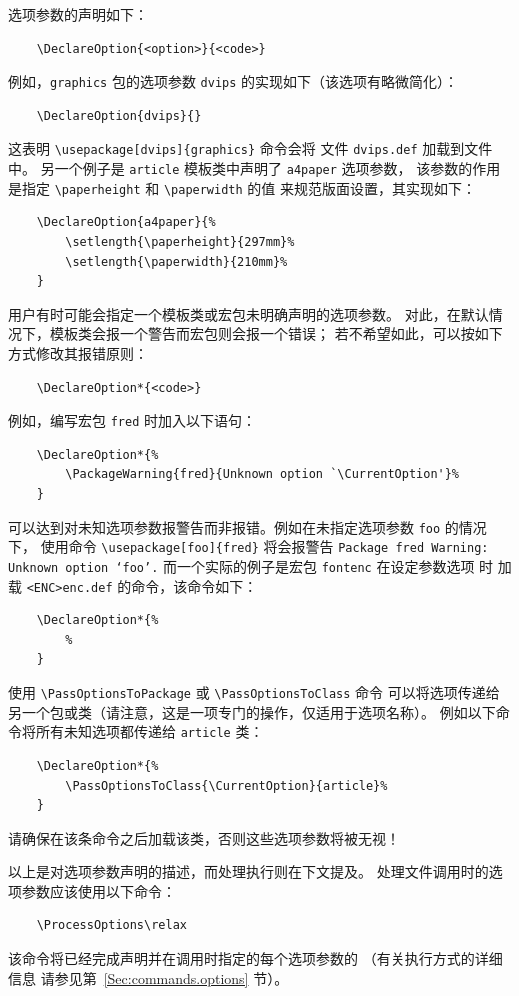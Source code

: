 \documentclass{ltxguide}[1995/11/28]
\begin{document}
选项参数的声明如下：
\begin{verbatim}
	\DeclareOption{<option>}{<code>}
\end{verbatim}
例如，\verb|graphics| 包的选项参数 \verb|dvips| 的实现如下（该选项有略微简化）：
\begin{verbatim}
	\DeclareOption{dvips}{}
\end{verbatim}
这表明 \verb|\usepackage[dvips]{graphics}| 命令会将
文件 \verb|dvips.def| 加载到文件中。
另一个例子是 \verb|article| 模板类中声明了 \verb|a4paper| 选项参数，
该参数的作用是指定 \verb|\paperheight| 和 \verb|\paperwidth| 的值
来规范版面设置，其实现如下：
\begin{verbatim}
	\DeclareOption{a4paper}{%
		\setlength{\paperheight}{297mm}%
		\setlength{\paperwidth}{210mm}%
	}
\end{verbatim}
用户有时可能会指定一个模板类或宏包未明确声明的选项参数。
对此，在默认情况下，模板类会报一个警告而宏包则会报一个错误；
若不希望如此，可以按如下方式修改其报错原则：
\begin{verbatim}
	\DeclareOption*{<code>}
\end{verbatim}
例如，编写宏包 \verb|fred| 时加入以下语句：
\begin{verbatim}
	\DeclareOption*{%
		\PackageWarning{fred}{Unknown option `\CurrentOption'}%
	}
\end{verbatim}
可以达到对未知选项参数报警告而非报错。例如在未指定选项参数 \verb|foo| 的情况下，
使用命令 \verb|\usepackage[foo]{fred}| 将会报警告 \texttt{Package fred Warning: Unknown option `foo'.}
而一个实际的例子是宏包 \verb|fontenc| 在设定参数选项  时
加载 \verb|<ENC>enc.def| 的命令，该命令如下：
\begin{verbatim}
	\DeclareOption*{%
		%
	}
\end{verbatim}
使用 \verb|\PassOptionsToPackage| 或 \verb|\PassOptionsToClass| 命令
可以将选项传递给另一个包或类（请注意，这是一项专门的操作，仅适用于选项名称）。
例如以下命令将所有未知选项都传递给 \verb|article| 类：
\begin{verbatim}
	\DeclareOption*{%
		\PassOptionsToClass{\CurrentOption}{article}%
	}
\end{verbatim}
请确保在该条命令之后加载该类，否则这些选项参数将被无视！

以上是对选项参数声明的描述，而处理执行则在下文提及。
处理文件调用时的选项参数应该使用以下命令：
\begin{verbatim}
	\ProcessOptions\relax
\end{verbatim}
该命令将已经完成声明并在调用时指定的每个选项参数的 （有关执行方式的详细信息
请参见第~\ref{Sec:commands.options} 节）。
\end{document}
